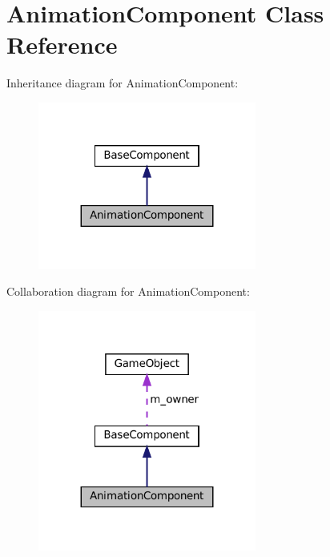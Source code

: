 \hypertarget{classAnimationComponent}{}\section{Animation\+Component Class Reference}
\label{classAnimationComponent}


Inheritance diagram for Animation\+Component\+:
\nopagebreak
\begin{figure}[H]
\begin{center}
\leavevmode
\includegraphics[width=203pt]{classAnimationComponent__inherit__graph}
\end{center}
\end{figure}


Collaboration diagram for Animation\+Component\+:
\nopagebreak
\begin{figure}[H]
\begin{center}
\leavevmode
\includegraphics[width=203pt]{classAnimationComponent__coll__graph}
\end{center}
\end{figure}
